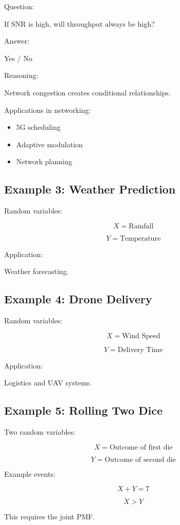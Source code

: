 \documentclass[11pt]{article}
\begin{document}
Question:

If SNR is high, will throughput always be high?

Answer:

Yes / No

Reasoning:

Network congestion creates conditional relationships.

Applications in networking:

\begin{itemize}
\item 5G scheduling
\item Adaptive modulation
\item Network planning
\end{itemize}

\subsection{Example 3: Weather Prediction}

Random variables:

\[
X = \text{Rainfall}
\]

\[
Y = \text{Temperature}
\]

Application:

Weather forecasting.

\subsection{Example 4: Drone Delivery}

Random variables:

\[
X = \text{Wind Speed}
\]

\[
Y = \text{Delivery Time}
\]

Application:

Logistics and UAV systems.

\subsection{Example 5: Rolling Two Dice}

Two random variables:

\[
X = \text{Outcome of first die}
\]

\[
Y = \text{Outcome of second die}
\]

Example events:

\[
X + Y = 7
\]

\[
X > Y
\]

This requires the joint PMF.
\end{document}
